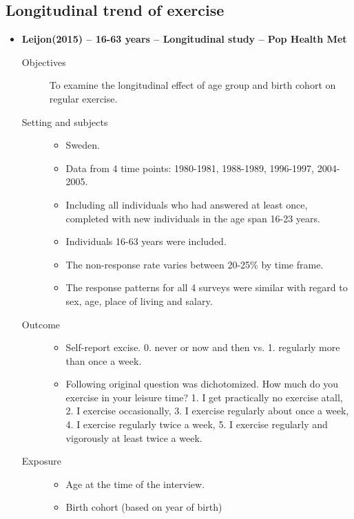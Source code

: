 \documentclass{article}
\begin{document}
\subsection{Longitudinal trend of exercise}
\begin{itemize}
	\item{\bf Leijon(2015) -- 16-63 years -- Longitudinal study -- Pop Health Met} 
		\begin{description}
			\item[Objectives]\mbox{}\par
				To examine the longitudinal effect of age group and birth cohort on regular exercise.
			\item[Setting and subjects]\mbox{}\par 
				\begin{itemize}
					\item Sweden. 
					\item Data from 4 time points: 1980-1981, 1988-1989, 1996-1997, 2004-2005. 
					\item Including all individuals who had answered at least once, completed with new individuals in the age span 16-23 years. 
					\item Individuals 16-63 years were included.
					\item The non-response rate varies between 20-25\% by time frame.
					\item The response patterns for all 4 surveys were similar with regard to sex, age, place of living and salary.
				\end{itemize}
			\item[Outcome]\mbox{}\par
				\begin{itemize}
					\item Self-report excise. 0. never or now and then vs. 1. regularly more than once a week. 
					\item Following original question was dichotomized. How much do you exercise in your leisure time? 1. I get practically no exercise atall, 2. I exercise occasionally, 3. I exercise regularly about once a week, 4. I exercise regularly twice a week, 5. I exercise regularly and vigorously at least twice a week.
				\end{itemize}
			\item[Exposure] \mbox{}\par
				\begin{itemize}
					\item Age at the time of the interview. 
					\item Birth cohort (based on year of birth)

\end{itemize}
\end{description}
\end{itemize}
\end{document}
